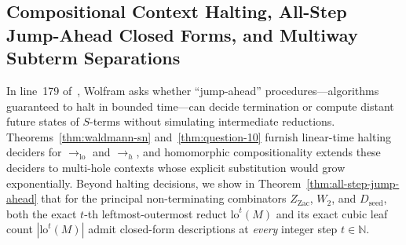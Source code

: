 \documentclass[11pt,reqno]{amsart}
\numberwithin{equation}{section}
\theoremstyle{plain}
\theoremstyle{definition}
\theoremstyle{remark}
\begin{document}
\subsection{Compositional Context Halting, All-Step Jump-Ahead Closed Forms, and Multiway Subterm Separations}
\label{subsec:jump-ahead}

In line~179 of~\cite{Wolfram2021Challenge}, Wolfram asks whether ``jump-ahead'' procedures---algorithms guaranteed to halt in bounded time---can decide termination or compute distant future states of $S$-terms without simulating intermediate reductions. Theorems~\ref{thm:waldmann-sn} and~\ref{thm:question-10} furnish linear-time halting deciders for $\to_{\mathrm{lo}}$ and $\to_h$, and homomorphic compositionality extends these deciders to multi-hole contexts whose explicit substitution would grow exponentially. Beyond halting decisions, we show in Theorem~\ref{thm:all-step-jump-ahead} that for the principal non-terminating combinators $Z_{\mathrm{Zac}}$, $W_2$, and $D_{\mathrm{seed}}$, both the exact $t$-th leftmost-outermost reduct $\mathrm{lo}^t(M)$ and its exact cubic leaf count $|\mathrm{lo}^t(M)|$ admit closed-form descriptions at \emph{every} integer step $t \in \mathbb{N}$.
\end{document}
